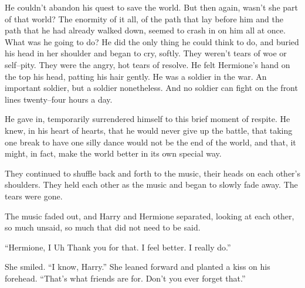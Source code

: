 He couldn’t abandon his quest to save the world. But then again, wasn’t she part of that world? The enormity of it all, of the path that lay before him and the path that he had already walked down, seemed to crash in on him all at once.
\SmallVSpace
What was he going to do?
\SmallVSpace
He did the only thing he could think to do, and buried his head in her shoulder and began to cry, softly. They weren’t tears of woe or self\mbox{--}pity. They were the angry, hot tears of resolve. He felt Hermione’s hand on the top his head, patting his hair gently. He was a soldier in the war. An important soldier, but a soldier nonetheless. And no soldier can fight on the front lines twenty\mbox{--}four hours a day.


He gave in, temporarily surrendered himself to this brief moment of respite. He knew, in his heart of hearts, that he would never give up the battle, that taking one break to have one silly dance would not be the end of the world, and that, it might, in fact, make the world better in its own special way.

\SmallVSpace
They continued to shuffle back and forth to the music, their heads on each other’s shoulders. They held each other as the music and began to slowly fade away. The tears were gone.


The music faded out, and Harry and Hermione separated, looking at each other, so much unsaid, so much that did not need to be said.

“Hermione, I{\el} Uh{\el} Thank you for that. I feel better. I really do.”

She smiled. “I know, Harry.” She leaned forward and planted a kiss on his forehead. “That’s what friends are for. Don’t you ever forget that.”